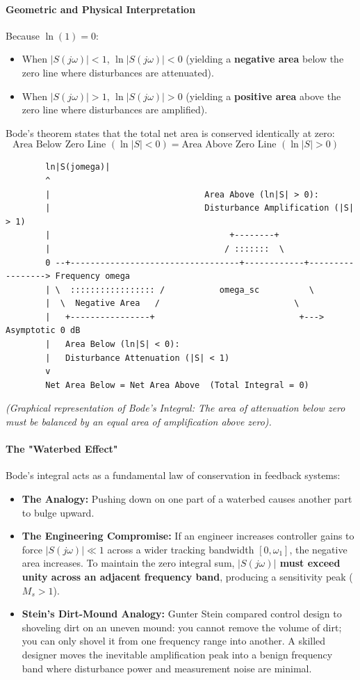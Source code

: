 \documentclass[12pt,onecolumn,twoside ]{article}
\begin{document}
	\paragraph{Geometric and Physical Interpretation}
	Because $\ln(1) = 0$:
	\begin{itemize}
		\item
		When $|S(j\omega)| < 1$, $\ln |S(j\omega)| < 0$ (yielding a \textbf{negative area} below the zero line where disturbances are attenuated).
		\item
		When $|S(j\omega)| > 1$, $\ln |S(j\omega)| > 0$ (yielding a \textbf{positive area} above the zero line where disturbances are amplified).
	\end{itemize}
	Bode's theorem states that the total net area is conserved identically at zero: \[
	\text{Area Below Zero Line } (\ln |S| < 0) = \text{Area Above Zero Line } (\ln |S| > 0) \quad
	\]
	\begin{lstlisting}
		ln|S(jomega)|
		^
		|                               Area Above (ln|S| > 0):
		|                               Disturbance Amplification (|S| > 1)
		|                                    +--------+
		|                                   / :::::::  \
		0 --+----------------------------------+------------+-----------------> Frequency omega
		| \  ::::::::::::::::: /           omega_sc          \
		|  \  Negative Area   /                           \
		|   +----------------+                             +---> Asymptotic 0 dB
		|   Area Below (ln|S| < 0):
		|   Disturbance Attenuation (|S| < 1)
		v
		Net Area Below = Net Area Above  (Total Integral = 0)
	\end{lstlisting}
	\textit{(Graphical representation of Bode's Integral: The area of attenuation below zero must be balanced by an equal area of amplification above zero).}
	\paragraph{The "Waterbed Effect"}
	Bode's integral acts as a fundamental law of conservation in feedback systems:
	\begin{itemize}
		\item
		\textbf{The Analogy:} Pushing down on one part of a waterbed causes another part to bulge upward.
		\item
		\textbf{The Engineering Compromise:} If an engineer increases controller gains to force $|S(j\omega)| \ll 1$ across a wider tracking bandwidth $[0, \omega_1]$, the negative area increases. To maintain the zero integral sum, \textbf{$|S(j\omega)|$ must exceed unity across an adjacent frequency band}, producing a sensitivity peak ($M_s > 1$).
		\item
		\textbf{Stein’s Dirt-Mound Analogy:} Gunter Stein compared control design to shoveling dirt on an uneven mound: you cannot remove the volume of dirt; you can only shovel it from one frequency range into another. A skilled designer moves the inevitable amplification peak into a benign frequency band where disturbance power and measurement noise are minimal.
	\end{itemize}
	
\end{document}
